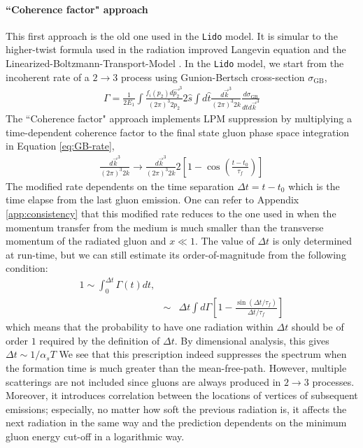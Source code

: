 \documentclass[aps, prc, reprint, amsmath, groupedaddress, nofootinbib]{revtex4-1}
\begin{document}
\paragraph*{``Coherence factor" approach} This first approach is the old one used in the {\tt Lido} model. 
It is simular to the higher-twist formula used in the radiation improved Langevin equation \cite{Cao:2013ita} and the Linearized-Boltzmann-Transport-Model \cite{Cao:2016gvr,Cao:2017hhk}.
In the {\tt Lido} model, we start from the incoherent rate of a $2\rightarrow 3$ process using Gunion-Bertsch cross-section $\sigma_\textrm{GB}$,
\begin{eqnarray}\label{eq:GB-rate}
\Gamma = \frac{1}{2E_1}\int\frac{f_i(p_2)d\vec{p_2}^3}{(2\pi)^3 2p_2}2\hat{s}\int d\hat{t}\frac{d\vec{k}^3}{(2\pi)^3 2k}\frac{d\sigma_{\textrm{GB}}}{d\hat{t}d\vec{k}^3}
\end{eqnarray}
The ``Coherence factor" approach implements LPM suppression by multiplying a time-dependent coherence factor to the final state gluon phase space integration in Equation \ref{eq:GB-rate},
\begin{eqnarray}\label{eq:GB-rate-LPM}
\frac{d\vec{k}^3}{(2\pi)^3 2k} \rightarrow \frac{d\vec{k}^3}{(2\pi)^3 2k} 2\left[1-\cos\left(\frac{t-t_0}{\tau_f}\right)\right]
\end{eqnarray}
The modified rate dependents on the time separation $\Delta t = t-t_0$ which is the time elapse from the last gluon emission.
One can refer to Appendix \ref{app:consistency} that this modified rate reduces to the one used in \cite{Cao:2013ita} when the momentum transfer from the medium is much smaller than the transverse momentum of the radiated gluon and $x\ll 1$.
The value of $\Delta t$ is only determined at run-time,
but we can still estimate its order-of-magnitude from the following condition:
\begin{eqnarray}\label{eq:delta-t-1}
\nonumber
1 \sim \int_0^{\Delta t}\Gamma(t) dt,\\
&\sim& \Delta t \int d\Gamma \left[1-\frac{\sin(\Delta t/\tau_f)}{\Delta t/\tau_f}\right]
\end{eqnarray}
which means that the probability to have one radiation within $\Delta t$ should be of order $1$ required by the definition of $\Delta t$.
By dimensional analysis, this gives $\Delta t \sim 1/\alpha_s T$
We see that this prescription indeed suppresses the spectrum when the formation time is much greater than the mean-free-path. 
However, multiple scatterings are not included since gluons are always produced in $2\rightarrow3$ processes.
Moreover, it introduces correlation between the locations of vertices of subsequent emissions;
especially, no matter how soft the previous radiation is, it affects the next radiation in the same way and the prediction dependents on the minimum gluon energy cut-off in a logarithmic way.
\end{document}
